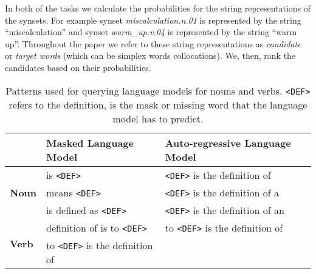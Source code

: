 \documentclass[11pt,a4paper]{article}
\begin{document}

In both of the tasks we calculate the probabilities for the
string representations of the synsets. For example synset
\emph{miscalculation.n.01} is represented by the string
``miscalculation'' and synset \emph{warm\_up.v.04} is
represented by the string ``warm up''. Throughout the paper
we refer to these string representations as
\textit{candidate} or \textit{target words} (which can be
simplex words collocations). We, then, rank the candidates
based on their probabilities.


\begin{table*}
\centering
\begin{tabular}{lll}
\hline
& \textbf{Masked Language Model} & \textbf{Auto-regressive Language Model}\\ \hline
\multirow{3}{*}{\textbf{Noun}} & \underline{\hspace{3mm}} is \texttt{<DEF>} & \texttt{<DEF>} is the definition of \underline{\hspace{3mm}} \\
 & \underline{\hspace{3mm}} means \texttt{<DEF>} & \texttt{<DEF>} is the definition of a \underline{\hspace{3mm}} \\
 & \underline{\hspace{3mm}} is defined as \texttt{<DEF>} & \texttt{<DEF>} is the definition of an \underline{\hspace{3mm}}\\ \hline
 \multirow{2}{*}{\textbf{Verb}} & definition of \underline{\hspace{3mm}} is to \texttt{<DEF>} & to \texttt{<DEF>} is the definition of \underline{\hspace{3mm}} \\
 & to \texttt{<DEF>} is the definition of \underline{\hspace{3mm}} & \\ \hline
 
\end{tabular}
\caption{Patterns used for querying language models for
  nouns and verbs.
\texttt{<DEF>} refers to the definition,
\underline{\hspace{3mm}} is the mask or missing word that
the language model has to predict.}
\label{tab:patterns}
\end{table*}
\end{document}
